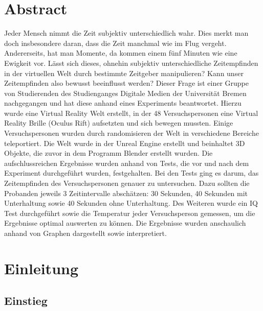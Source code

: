 \documentclass{Paper}
\begin{document}
\maketitle


\tableofcontents
\clearpage
	
\section{Abstract}

Jeder Mensch nimmt die Zeit subjektiv unterschiedlich wahr. Dies merkt man doch insbesondere daran, dass die Zeit manchmal wie im Flug vergeht. Andererseits, hat man Momente, da kommen einem fünf Minuten wie eine Ewigkeit vor. Lässt sich dieses, ohnehin subjektiv unterschiedliche Zeitempfinden in der virtuellen Welt durch bestimmte Zeitgeber manipulieren? Kann unser Zeitempfinden also bewusst beeinflusst werden?  Dieser Frage ist einer Gruppe von Studierenden des Studienganges Digitale Medien der Universität Bremen nachgegangen und hat diese anhand eines Experiments beantwortet. Hierzu wurde eine Virtual Reality Welt erstellt, in der 48 Versuchspersonen eine Virtual Reality Brille (Oculus Rift) aufsetzten und sich bewegen mussten. Einige Versuchspersonen wurden durch randomisieren der Welt in verschiedene Bereiche teleportiert. Die Welt wurde in der Unreal Engine erstellt und beinhaltet 3D Objekte, die zuvor in dem Programm Blender erstellt wurden.  Die aufschlussreichen Ergebnisse wurden anhand von Tests, die vor und nach dem Experiment durchgeführt wurden, festgehalten. Bei den Tests ging es darum, das Zeitempfinden des Versuchspersonen genauer zu untersuchen. Dazu sollten die Probanden jeweils 3 Zeitintervalle abschätzen: 30 Sekunden, 40 Sekunden mit Unterhaltung sowie 40 Sekunden ohne Unterhaltung. Des Weiteren wurde ein IQ Test durchgeführt sowie die Temperatur jeder Versuchsperson gemessen, um die Ergebnisse optimal auswerten zu können. Die Ergebnisse wurden anschaulich anhand von Graphen dargestellt sowie interpretiert.



\section{Einleitung}
\subsection{Einstieg}
\end{document}
